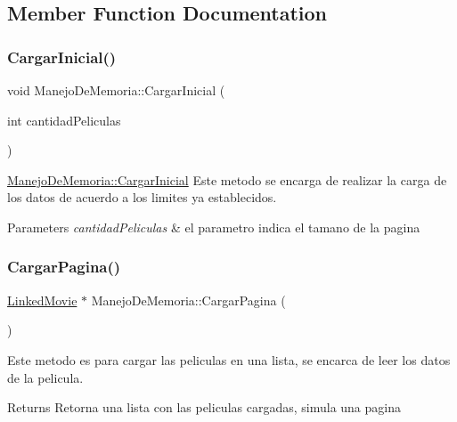 \subsection{Member Function Documentation}
\mbox{\label{classManejoDeMemoria_af055a25f1736ffbd7c73a7746f6b378d}} 
\subsubsection{\texorpdfstring{Cargar\+Inicial()}{CargarInicial()}}
{\footnotesize\ttfamily void Manejo\+De\+Memoria\+::\+Cargar\+Inicial (\begin{DoxyParamCaption}\item[{int}]{cantidad\+Peliculas }\end{DoxyParamCaption})}



\hyperlink{classManejoDeMemoria_af055a25f1736ffbd7c73a7746f6b378d}{Manejo\+De\+Memoria\+::\+Cargar\+Inicial} Este metodo se encarga de realizar la carga de los datos de acuerdo a los limites ya establecidos. 


\begin{DoxyParams}{Parameters}
{\em cantidad\+Peliculas} & el parametro indica el tamano de la pagina \\
\hline
\end{DoxyParams}
\mbox{\label{classManejoDeMemoria_ab49d59242fb72d41a4885ef410ce77ff}} 
\subsubsection{\texorpdfstring{Cargar\+Pagina()}{CargarPagina()}}
{\footnotesize\ttfamily \hyperlink{classLinkedMovie}{Linked\+Movie} $\ast$ Manejo\+De\+Memoria\+::\+Cargar\+Pagina (\begin{DoxyParamCaption}{ }\end{DoxyParamCaption})}



Este metodo es para cargar las peliculas en una lista, se encarca de leer los datos de la pelicula. 

\begin{DoxyReturn}{Returns}
Retorna una lista con las peliculas cargadas, simula una pagina 
\end{DoxyReturn}
\mbox{\label{classManejoDeMemoria_a2d4239a7776d1588548a39dc1b1a7807}} 

